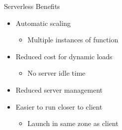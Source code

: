 \documentclass{slide}
\begin{document}
\begin{frame}{Serverless Benefits}
\vspace{1pt}
{\huge
\begin{itemize}
    \item<1-> Automatic scaling
    \begin{itemize}
        \LARGE\item Multiple instances of function
    \end{itemize}
    \vspace{1mm}
    \item<2-> Reduced cost for dynamic loads
    \begin{itemize}
        \LARGE\item No server idle time
    \end{itemize}
    \item<3-> Reduced server management
    \vspace{1mm}
    \item<4-> Easier to run closer to client
    \begin{itemize}
        \LARGE\item Launch in same zone as client 
    \end{itemize}
\end{itemize}
}
\end{frame}
\end{document}
